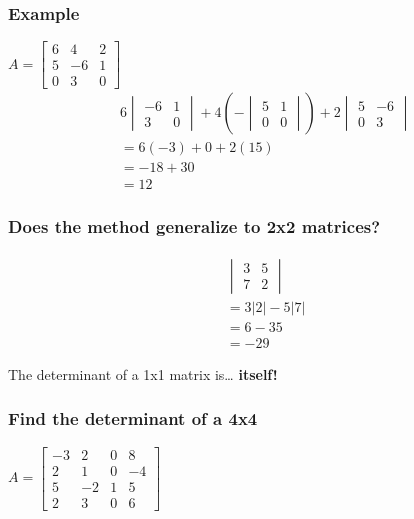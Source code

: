 \documentclass[
  letterpaper,
  DIV=11,
  numbers=noendperiod]{scrartcl}
\begin{document}
\hypertarget{example-1}{%
\subsubsection{Example}\label{example-1}}

\(A = \begin{bmatrix} 6 & 4 & 2 \\ 5 & -6 & 1 \\ 0 & 3 & 0\end{bmatrix}\)
\begin{align*}
& 6\begin{vmatrix}-6 & 1 \\ 3 & 0\end{vmatrix}+4\left(-\begin{vmatrix}5&1 \\ 0 & 0\end{vmatrix}\right)+2\begin{vmatrix}5 & -6 \\ 0 & 3\end{vmatrix} \\
&= 6(-3) + 0 + 2(15) \\
&= -18 + 30 \\
&= 12
\end{align*}

\hypertarget{does-the-method-generalize-to-2x2-matrices}{%
\subsubsection{Does the method generalize to 2x2
matrices?}\label{does-the-method-generalize-to-2x2-matrices}}

\begin{align*}
&\begin{vmatrix}3 & 5 \\ 7 & 2\end{vmatrix} \\
&=3|2|-5|7| \\
&=6-35 \\
&=-29
\end{align*}

The determinant of a 1x1 matrix is\ldots{} \textbf{itself!}

\hypertarget{find-the-determinant-of-a-4x4}{%
\subsubsection{Find the determinant of a
4x4}\label{find-the-determinant-of-a-4x4}}

\(A=\begin{bmatrix}-3 & 2 & 0 & 8 \\ 2 & 1 & 0 & -4 \\ 5 & -2 & 1 & 5 \\ 2 & 3 & 0 & 6\end{bmatrix}\)
\end{document}
